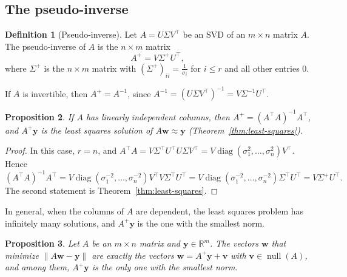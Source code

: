 \documentclass[11pt]{article}
\newcommand{\norm}[1]{\lVert #1 \rVert}
\theoremstyle{definition}
\newtheorem{definition}{Definition}[section]
\theoremstyle{plain}
\newtheorem{proposition}[definition]{Proposition}
\theoremstyle{remark}
\DeclareMathOperator{\Null}{null}
\DeclareMathOperator{\diag}{diag}
\begin{document}
\subsection{The pseudo-inverse}

\begin{definition}[Pseudo-inverse]
    Let $A = U\Sigma V^\top$ be an SVD of an $m \times n$ matrix $A$. The pseudo-inverse of $A$ is the $n \times m$ matrix
    \[A^+ = V \Sigma^+ U^\top,\]
    where $\Sigma^+$ is the $n \times m$ matrix with $(\Sigma^+)_{ii} = \frac{1}{\sigma_i}$ for $i \leq r$ and all other entries $0$.
\end{definition}

If $A$ is invertible, then $A^+ = A^{-1}$, since $A^{-1} = (U\Sigma V^\top)^{-1} = V\Sigma^{-1}U^\top$.

\begin{proposition}\label{prop:pinv}
    If $A$ has linearly independent columns, then $A^+ = (A^\top A)^{-1} A^\top$, and $A^+ \mathbf{y}$ is the least squares solution of $A\mathbf{w} \approx \mathbf{y}$ (Theorem~\ref{thm:least-squares}).
\end{proposition}

\begin{proof}
    In this case, $r = n$, and $A^\top A = V\Sigma^\top U^\top U \Sigma V^\top = V \diag(\sigma_1^2, \ldots, \sigma_n^2) V^\top$. Hence
    \[(A^\top A)^{-1} A^\top = V \diag(\sigma_1^{-2}, \ldots, \sigma_n^{-2}) V^\top V \Sigma^\top U^\top = V \diag(\sigma_1^{-2}, \ldots, \sigma_n^{-2}) \Sigma^\top U^\top = V \Sigma^+ U^\top.\]
    The second statement is Theorem~\ref{thm:least-squares}.
\end{proof}

In general, when the columns of $A$ are dependent, the least squares problem has infinitely many solutions, and $A^+\mathbf{y}$ is the one with the smallest norm.

\begin{proposition}\label{prop:pinv-min-norm}
    Let $A$ be an $m \times n$ matrix and $\mathbf{y} \in \mathbb{R}^m$. The vectors $\mathbf{w}$ that minimize $\norm{A\mathbf{w} - \mathbf{y}}$ are exactly the vectors $\mathbf{w} = A^+\mathbf{y} + \mathbf{v}$ with $\mathbf{v} \in \Null(A)$, and among them, $A^+\mathbf{y}$ is the only one with the smallest norm.
\end{proposition}
\end{document}
